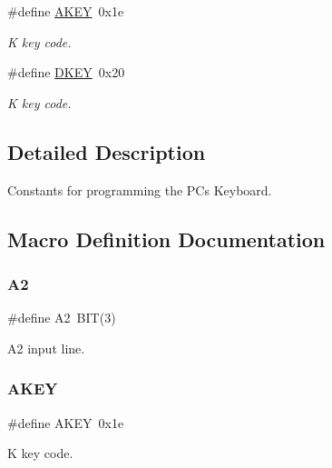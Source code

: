 \begin{DoxyCompactItemize}
\#define \hyperlink{group__Keyboard_ga746a67a50a93dd2cac52c218ef94a218}{A\+K\+EY}~0x1e
\begin{DoxyCompactList}\small\item\em K key code. \end{DoxyCompactList}\item 
\#define \hyperlink{group__Keyboard_gae108a0974a5073bf40514974c1e98028}{D\+K\+EY}~0x20
\begin{DoxyCompactList}\small\item\em K key code. \end{DoxyCompactList}\end{DoxyCompactItemize}


\subsection{Detailed Description}
Constants for programming the PC\textquotesingle{}s Keyboard. 

\subsection{Macro Definition Documentation}
\mbox{\label{group__Keyboard_ga2946bc30423c2a996eeafa49e995c30e}} 
\subsubsection{\texorpdfstring{A2}{A2}}
{\footnotesize\ttfamily \#define A2~B\+IT(3)}



A2 input line. 

\mbox{\label{group__Keyboard_ga746a67a50a93dd2cac52c218ef94a218}} 
\subsubsection{\texorpdfstring{A\+K\+EY}{AKEY}}
{\footnotesize\ttfamily \#define A\+K\+EY~0x1e}



K key code. 

\mbox{\label{group__Keyboard_ga1b41fd2be63532d4ab910f8b256c3811}} 
